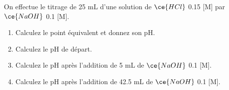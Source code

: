 \documentclass[
  11pt,
  a4paper,
  openany]{book}
\providecommand{\tightlist}{%
  \setlength{\itemsep}{0pt}\setlength{\parskip}{0pt}}
\begin{document}
\begin{Exercise}

On effectue le titrage de 25 mL d'une solution de \(\ce{HCl}\) 0.15 {[}M{]} par \(\ce{NaOH}\) 0.1 {[}M{]}.

\begin{enumerate}
\def\labelenumi{\alph{enumi}.}
\tightlist
\item
  Calculez le point équivalent et donnez son pH.
\item
  Calculez le pH de départ.
\item
  Calculez le pH après l'addition de 5 mL de \(\ce{NaOH}\) 0.1 {[}M{]}.
\item
  Calculez le pH après l'addition de 42.5 mL de \(\ce{NaOH}\) 0.1 {[}M{]}.
\end{enumerate}

\end{Exercise}
\end{document}
